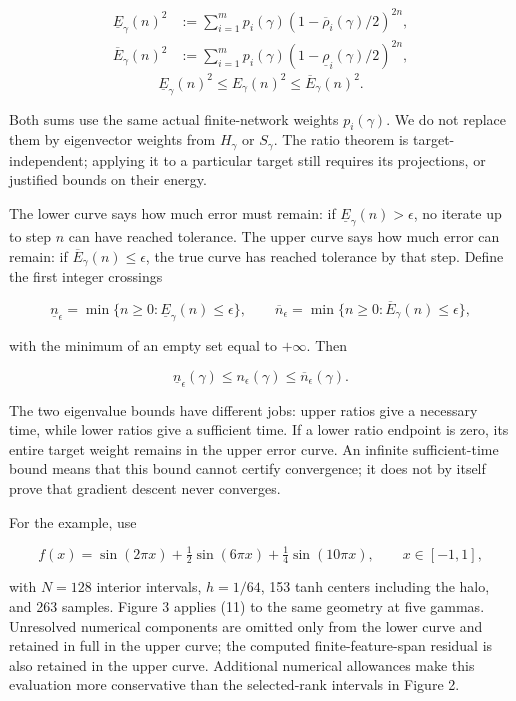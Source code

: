\documentclass[11pt]{article}
\begin{document}
\[
\begin{aligned}
\underline E_\gamma(n)^2
&:=\sum_{i=1}^{m}p_i(\gamma)(1-\overline\rho_i(\gamma)/2)^{2n},\\
\overline E_\gamma(n)^2
&:=\sum_{i=1}^{m}p_i(\gamma)(1-\underline\rho_i(\gamma)/2)^{2n},
\end{aligned}
\]
\[
\boxed{\underline E_\gamma(n)^2\le E_\gamma(n)^2\le\overline E_\gamma(n)^2.}
\tag{11}
\]

Both sums use the same actual finite-network weights \(p_i(\gamma)\). We do not replace them by eigenvector weights from \(H_\gamma\) or \(S_\gamma\). The ratio theorem is target-independent; applying it to a particular target still requires its projections, or justified bounds on their energy.

The lower curve says how much error must remain: if \(\underline E_\gamma(n)>\epsilon\), no iterate up to step \(n\) can have reached tolerance. The upper curve says how much error can remain: if \(\overline E_\gamma(n)\le\epsilon\), the true curve has reached tolerance by that step. Define the first integer crossings

\[
\underline n_\epsilon=\min\{n\ge0:\underline E_\gamma(n)\le\epsilon\},
\qquad
\overline n_\epsilon=\min\{n\ge0:\overline E_\gamma(n)\le\epsilon\},
\]

with the minimum of an empty set equal to \(+\infty\). Then

\[
\boxed{\underline n_\epsilon(\gamma)\le n_\epsilon(\gamma)\le\overline n_\epsilon(\gamma).}
\tag{12}
\]

The two eigenvalue bounds have different jobs: upper ratios give a necessary time, while lower ratios give a sufficient time. If a lower ratio endpoint is zero, its entire target weight remains in the upper error curve. An infinite sufficient-time bound means that this bound cannot certify convergence; it does not by itself prove that gradient descent never converges.

For the example, use

\[
f(x)=\sin(2\pi x)+\tfrac12\sin(6\pi x)+\tfrac14\sin(10\pi x),
\qquad x\in[-1,1],
\]

with \(N=128\) interior intervals, \(h=1/64\), 153 tanh centers including the halo, and 263 samples. Figure 3 applies (11) to the same geometry at five gammas. Unresolved numerical components are omitted only from the lower curve and retained in full in the upper curve; the computed finite-feature-span residual is also retained in the upper curve. Additional numerical allowances make this evaluation more conservative than the selected-rank intervals in Figure 2.
\end{document}
